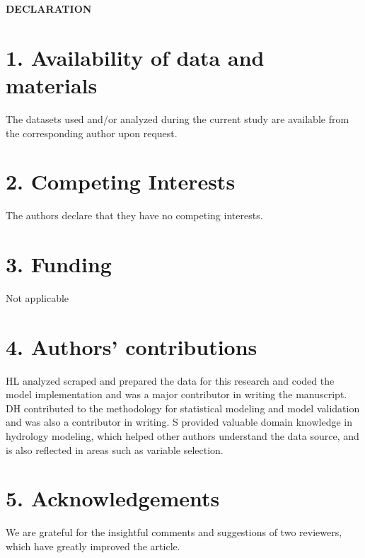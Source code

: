 \documentclass{svjour3}
\begin{document}
\begin{center}
	\textbf{DECLARATION}
\end{center}

\section*{1. Availability of data and materials}
The datasets used and/or analyzed during the current study are available from the corresponding author upon request.
\section*{2. Competing Interests}
The authors declare that they have no competing interests.
\section*{3. Funding}
Not applicable
\section*{4. Authors' contributions}
HL analyzed scraped and prepared the data for this research and coded the model implementation and was a major contributor in writing the manuscript.
DH contributed to the methodology for statistical modeling and model validation and was also a contributor in writing.
S provided valuable domain knowledge in hydrology modeling, which helped other authors understand the data source, and is also reflected in areas such as variable selection.

\section*{5. Acknowledgements}
We are grateful for the insightful comments and suggestions of two reviewers, which have greatly improved the article.


\newpage
\end{document}
